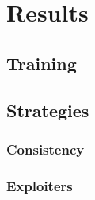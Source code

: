 \chapter{Results}

\section{Training}
\section{Strategies}
\subsection{Consistency}
\subsection{Exploiters}